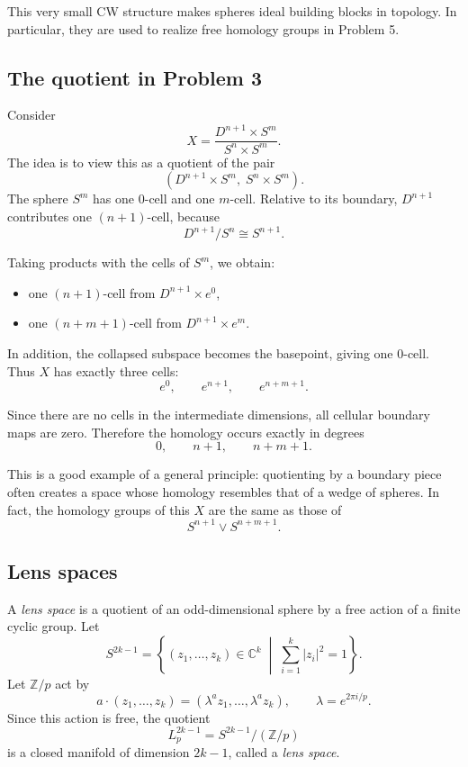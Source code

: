 \documentclass[12pt,a4paper]{article}
\theoremstyle{notespace}
\begin{document}
This very small CW structure makes spheres ideal building blocks in topology. In particular, they are used to realize free homology groups in Problem 5.

\subsection{The quotient in Problem 3}

Consider
\[
X=\frac{D^{n+1}\times S^m}{S^n\times S^m}.
\]
The idea is to view this as a quotient of the pair
\[
(D^{n+1}\times S^m,\; S^n\times S^m).
\]
The sphere \(S^m\) has one \(0\)-cell and one \(m\)-cell. Relative to its boundary, \(D^{n+1}\) contributes one \((n+1)\)-cell, because
\[
D^{n+1}/S^n\cong S^{n+1}.
\]

Taking products with the cells of \(S^m\), we obtain:
\begin{itemize}
	\item one \((n+1)\)-cell from \(D^{n+1}\times e^0\),
	\item one \((n+m+1)\)-cell from \(D^{n+1}\times e^m\).
\end{itemize}
In addition, the collapsed subspace becomes the basepoint, giving one \(0\)-cell. Thus \(X\) has exactly three cells:
\[
e^0,\qquad e^{n+1},\qquad e^{n+m+1}.
\]

Since there are no cells in the intermediate dimensions, all cellular boundary maps are zero. Therefore the homology occurs exactly in degrees
\[
0,\qquad n+1,\qquad n+m+1.
\]

This is a good example of a general principle: quotienting by a boundary piece often creates a space whose homology resembles that of a wedge of spheres. In fact, the homology groups of this \(X\) are the same as those of
\[
S^{n+1}\vee S^{n+m+1}.
\]

\subsection{Lens spaces}

A \emph{lens space} is a quotient of an odd-dimensional sphere by a free action of a finite cyclic group. Let
\[
S^{2k-1}
=
\left\{
(z_1,\dots,z_k)\in \mathbb C^k
\;\middle|\;
\sum_{i=1}^k |z_i|^2=1
\right\}.
\]
Let \(\mathbb Z/p\) act by
\[
a\cdot (z_1,\dots,z_k)
=
(\lambda^a z_1,\dots,\lambda^a z_k),
\qquad
\lambda=e^{2\pi i/p}.
\]
Since this action is free, the quotient
\[
L_p^{2k-1}=S^{2k-1}/(\mathbb Z/p)
\]
is a closed manifold of dimension \(2k-1\), called a \emph{lens space}.
\end{document}
